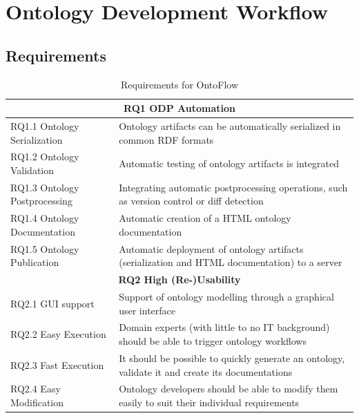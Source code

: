 \documentclass[runningheads]{llncs}
\begin{document}
\section{Ontology Development Workflow}
\label{sec:ontoflow}
\subsection{Requirements}

\begin{table}[hbt]
\caption{Requirements for OntoFlow}
\renewcommand{\arraystretch}{1.3}
  \begin{tabular}{p{} p{}}
  \hline
  \multicolumn{2}{c}{\textbf{RQ1 ODP Automation}} \\
  \hline\hline
  RQ1.1 Ontology Serialization & Ontology artifacts can be automatically serialized in common RDF formats \\
  
  RQ1.2 Ontology Validation & Automatic testing of ontology artifacts is integrated \\
  
  RQ1.3 Ontology Postprocessing & Integrating automatic postprocessing operations, such as version control or diff detection \\

  RQ1.4 Ontology  Documentation & Automatic creation of a HTML ontology documentation \\

  RQ1.5 Ontology Publication & Automatic deployment of ontology artifacts (serialization and HTML documentation) to a server \\
  \hline
  \multicolumn{2}{c}{\textbf{RQ2 High (Re-)Usability}} \\
  \hline
  \hline
  RQ2.1 GUI support & Support of ontology modelling through a graphical user interface \\
  
  RQ2.2 Easy Execution & Domain experts (with little to no IT background) should be able to trigger ontology workflows \\
  
  RQ2.3 Fast Execution & It should be possible to quickly generate an ontology, validate it and create its documentations \\
  
  RQ2.4 Easy Modification & Ontology developers should be able to modify them easily to suit their individual requirements \\
\hline
\end{tabular}
\label{tab:req}
\end{table}
\end{document}
